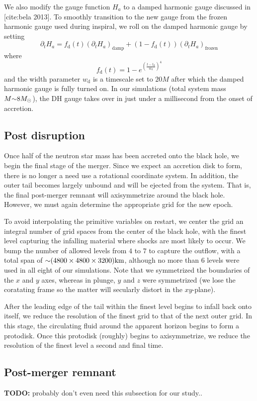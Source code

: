 We also modify the gauge function $H_a$ to a damped harmonic gauge discussed in [cite:bela 2013].  To smoothly transition to the new gauge from the frozen harmonic gauge used during inspiral, we roll on the damped harmonic gauge by setting
\begin{equation}
\partial_t H_a = f_\textrm{d}(t) (\partial_t H_a)_\textrm{damp} + (1 - f_\textrm{d}(t)) (\partial_t H_a)_\textrm{frozen}
\end{equation}
where 
\begin{equation}
f_\textrm{d}(t) = 1 - e^{ \left(\frac{t-t_\textrm{d}}{w_\textrm{d}} \right)^4 }
\end{equation}
and the width parameter $w_\textrm{d}$ is a timescale set to $20 M$ after which the damped harmonic gauge is fully turned on.  In our simulations (total system mass $M \mathord{\sim} 8 M_\odot$), the DH gauge takes over in just under a millisecond from the onset of accretion.


\subsection{Post disruption}

Once half of the neutron star mass has been accreted onto the black hole, we begin the final stage of the merger.  Since we expect an accretion disk to form, there is no longer a need use a rotational coordinate system.
In addition, the outer tail becomes largely unbound and will be ejected from the system.  
That is, the final post-merger remnant will axisymmetrize around the black hole.
However, we must again determine the appropriate grid for the new epoch.

To avoid interpolating the primitive variables on restart, we center the grid an integral number of grid spaces from the center of the black hole, with the finest level capturing the infalling material where shocks are most likely to occur.  
We bump the number of allowed levels from $4$ to $7$ to capture the outflow, with a total span of $\mathord{\sim}(4800 \times 4800 \times 3200) \textrm{km}$, although no more than $6$ levels were used in all eight of our simulations.
Note that we symmetrized the boundaries of the $x$ and $y$ axes, whereas in plunge, $y$ and $z$ were symmetrized (we lose the coratating frame so the matter will secularly distort in the $xy$-plane).    

After the leading edge of the tail within the finest level begins to infall back onto itself, we reduce the resolution of the finest grid to that of the next outer grid. 
In this stage, the circulating fluid around the apparent horizon begins to form a protodisk.
Once this protodisk (roughly) begins to axisymmetrize, we reduce the resolution of the finest level a second and final time.

\subsection{Post-merger remnant}

\textbf{TODO:} probably don't even need this subsection for our study..











